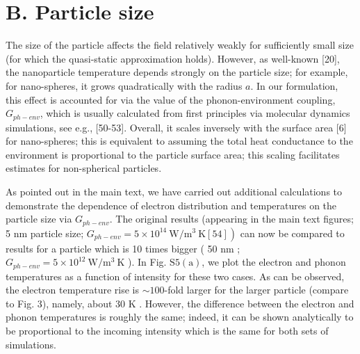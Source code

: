 \documentclass[10pt]{article}
\begin{document}
\section*{B. Particle size}
The size of the particle affects the field relatively weakly for sufficiently small size (for which the quasi-static approximation holds). However, as well-known [20], the nanoparticle temperature depends strongly on the particle size; for example, for nano-spheres, it grows quadratically with the radius $a$. In our formulation, this effect is accounted for via the value of the phonon-environment coupling, $G_{p h-e n v}$, which is usually calculated from first principles via molecular dynamics simulations, see e.g., [50-53]. Overall, it scales inversely with the surface area [6] for nano-spheres; this is equivalent to assuming the total heat conductance to the environment is proportional to the particle surface area; this scaling facilitates estimates for non-spherical particles.

As pointed out in the main text, we have carried out additional calculations to demonstrate the dependence of electron distribution and temperatures on the particle size via $G_{p h-e n v}$. The original results (appearing in the main text figures; 5 nm particle size; $\left.G_{p h-e n v}=5 \times 10^{14} \mathrm{~W} / \mathrm{m}^{3} \mathrm{~K}[54]\right)$ can now be compared to results for a particle which is 10 times bigger ( 50 nm ; $G_{p h-e n v}=5 \times 10^{12} \mathrm{~W} / \mathrm{m}^{3} \mathrm{~K}$ ). In Fig. $\mathrm{S} 5(\mathrm{a})$, we plot the electron and phonon temperatures as a function of intensity for these two cases. As can be observed, the electron temperature rise is $\sim 100$-fold larger for the larger particle (compare to Fig. 3), namely, about 30 K . However, the difference between the electron and phonon temperatures is roughly the same; indeed, it can be shown analytically to be proportional to the incoming intensity which is the same for both sets of simulations.
\end{document}
